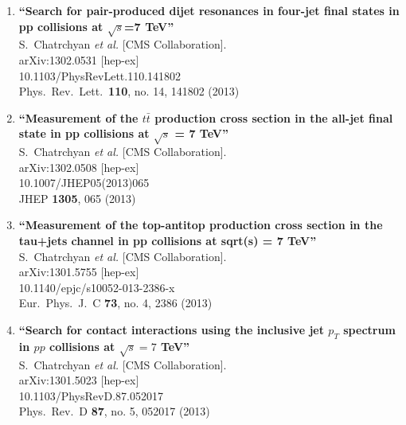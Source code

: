 \documentclass{article}
\begin{document}
\begin{enumerate}
\item%
{\bf ``Search for pair-produced dijet resonances in four-jet final states in pp collisions at $\sqrt{s}$=7  TeV''}
  \\{}S.~Chatrchyan {\it et al.}  [CMS Collaboration].
  \\{}arXiv:1302.0531 [hep-ex]
    \\{}10.1103/PhysRevLett.110.141802
\\{}Phys.\ Rev.\ Lett.\  {\bf 110}, no. 14, 141802 (2013) %


\item%
{\bf ``Measurement of the $t\bar{t}$ production cross section in the all-jet final state in pp collisions at $\sqrt{s}$ = 7 TeV''}
  \\{}S.~Chatrchyan {\it et al.}  [CMS Collaboration].
  \\{}arXiv:1302.0508 [hep-ex]
    \\{}10.1007/JHEP05(2013)065
\\{}JHEP {\bf 1305}, 065 (2013) %


\item%
{\bf ``Measurement of the top-antitop production cross section in the tau+jets channel in pp collisions at sqrt(s) = 7 TeV''}
  \\{}S.~Chatrchyan {\it et al.}  [CMS Collaboration].
  \\{}arXiv:1301.5755 [hep-ex]
    \\{}10.1140/epjc/s10052-013-2386-x
\\{}Eur.\ Phys.\ J.\ C {\bf 73}, no. 4, 2386 (2013) %


\item%
{\bf ``Search for contact interactions using the inclusive jet $p_T$ spectrum in $pp$ collisions at $\sqrt{s} = 7$ TeV''}
  \\{}S.~Chatrchyan {\it et al.}  [CMS Collaboration].
  \\{}arXiv:1301.5023 [hep-ex]
    \\{}10.1103/PhysRevD.87.052017
\\{}Phys.\ Rev.\ D {\bf 87}, no. 5, 052017 (2013) %



\end{enumerate}
\end{document}
